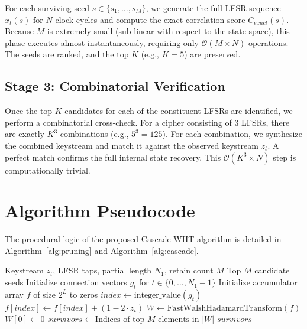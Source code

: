 For each surviving seed $s \in \{s_1, \dots, s_M\}$, we generate the full LFSR sequence $x_t(s)$ for $N$ clock cycles and compute the exact correlation score $C_{exact}(s)$. Because $M$ is extremely small (sub-linear with respect to the state space), this phase executes almost instantaneously, requiring only $\mathcal{O}(M \times N)$ operations. The seeds are ranked, and the top $K$ (e.g., $K=5$) are preserved.

\subsection{Stage 3: Combinatorial Verification}
Once the top $K$ candidates for each of the constituent LFSRs are identified, we perform a combinatorial cross-check. For a cipher consisting of 3 LFSRs, there are exactly $K^3$ combinations (e.g., $5^3 = 125$). For each combination, we synthesize the combined keystream and match it against the observed keystream $z_t$. A perfect match confirms the full internal state recovery. This $\mathcal{O}(K^3 \times N)$ step is computationally trivial.

\section{Algorithm Pseudocode}
\label{sec:pseudocode}

The procedural logic of the proposed Cascade WHT algorithm is detailed in Algorithm~\ref{alg:pruning} and Algorithm~\ref{alg:cascade}.

\begin{algorithm}[h]
\caption{Stage 1: WHT Spectral Pruning}
\label{alg:pruning}
\begin{algorithmic}[1]
\Require Keystream $z_t$, LFSR taps, partial length $N_1$, retain count $M$
\Ensure Top $M$ candidate seeds
\State Initialize connection vectors $g_t$ for $t \in \{0, \dots, N_1-1\}$
\State Initialize accumulator array $f$ of size $2^L$ to zeros
    \State $index \gets \text{integer\_value}(g_t)$
    \State $f[index] \gets f[index] + (1 - 2 \cdot z_t)$ 
\EndFor
\State $W \gets \text{FastWalshHadamardTransform}(f)$
\State $W[0] \gets 0$ 
\State $survivors \gets \text{Indices of top } M \text{ elements in } |W|$
\State \Return $survivors$
\end{algorithmic}
\end{algorithm}

